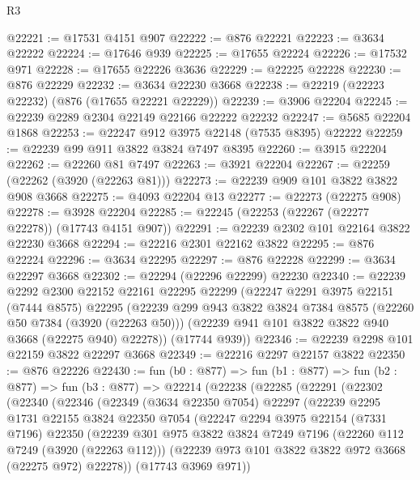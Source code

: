 \begin{lexlean}{R3}
\begin{coremodule}
@22221 := @17531 @4151 @907
@22222 := @876 @22221
@22223 := @3634 @22222
@22224 := @17646 @939
@22225 := @17655 @22224
@22226 := @17532 @971
@22228 := @17655 @22226 @3636
@22229 := @22225 @22228
@22230 := @876 @22229
@22232 := @3634 @22230 @3668
@22238 := @22219 (@22223 @22232) (@876 (@17655 @22221 @22229))
@22239 := @3906 @22204
@22245 := @22239 @2289 @2304 @22149 @22166 @22222 @22232
@22247 := @5685 @22204 @1868
@22253 := @22247 @912 @3975 @22148 (@7535 @8395) @22222
@22259 := @22239 @99 @911 @3822 @3824 @7497 @8395
@22260 := @3915 @22204
@22262 := @22260 @81 @7497
@22263 := @3921 @22204
@22267 := @22259 (@22262 (@3920 (@22263 @81)))
@22273 := @22239 @909 @101 @3822 @3822 @908 @3668
@22275 := @4093 @22204 @13
@22277 := @22273 (@22275 @908)
@22278 := @3928 @22204
@22285 := @22245 (@22253 (@22267 (@22277 @22278)) (@17743 @4151 @907))
@22291 := @22239 @2302 @101 @22164 @3822 @22230 @3668
@22294 := @22216 @2301 @22162 @3822
@22295 := @876 @22224
@22296 := @3634 @22295
@22297 := @876 @22228
@22299 := @3634 @22297 @3668
@22302 := @22294 (@22296 @22299) @22230
@22340 := @22239
    @2292
    @2300
    @22152
    @22161
    @22295
    @22299
    (@22247
      @2291
      @3975
      @22151
      (@7444 @8575)
      @22295
      (@22239
        @299
        @943
        @3822
        @3824
        @7384
        @8575
        (@22260 @50 @7384 (@3920 (@22263 @50)))
        (@22239 @941 @101 @3822 @3822 @940 @3668 (@22275 @940) @22278))
      (@17744 @939))
@22346 := @22239 @2298 @101 @22159 @3822 @22297 @3668
@22349 := @22216 @2297 @22157 @3822
@22350 := @876 @22226
@22430 := fun (b0 : @877) =>
  fun (b1 : @877) =>
  fun (b2 : @877) =>
  fun (b3 : @877) =>
  @22214
    (@22238
      (@22285
        (@22291
          (@22302
            (@22340
              (@22346
                (@22349
                  (@3634 @22350 @7054)
                  @22297
                  (@22239
                    @2295
                    @1731
                    @22155
                    @3824
                    @22350
                    @7054
                    (@22247
                      @2294
                      @3975
                      @22154
                      (@7331 @7196)
                      @22350
                      (@22239
                        @301
                        @975
                        @3822
                        @3824
                        @7249
                        @7196
                        (@22260 @112 @7249 (@3920 (@22263 @112)))
                        (@22239 @973 @101 @3822 @3822 @972 @3668 (@22275 @972) @22278))
                      (@17743 @3969 @971))

\end{coremodule}
\end{lexlean}

